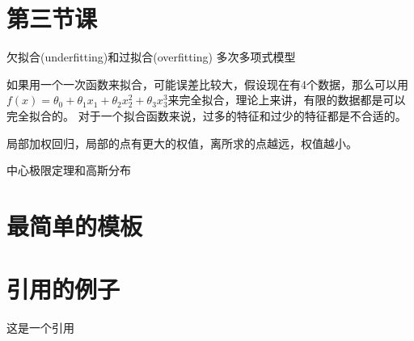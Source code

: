 \documentclass[a4paper,12pt]{ctexart}
\begin{document}
\section{第三节课}
欠拟合(underfitting)和过拟合(overfitting)
多次多项式模型

如果用一个一次函数来拟合，可能误差比较大，假设现在有4个数据，那么可以用$f(x)=\theta_{0}+\theta_{1}x_{1}+\theta_2x{_2^2}+\theta_3x{_3^3}$来完全拟合，理论上来讲，有限的数据都是可以完全拟合的。
对于一个拟合函数来说，过多的特征和过少的特征都是不合适的。

局部加权回归，局部的点有更大的权值，离所求的点越远，权值越小。

中心极限定理和高斯分布

\section{最简单的模板}


\section{引用的例子}
这是一个引用~\cite{LCN2002}


%


%
%

%
\end{document}
